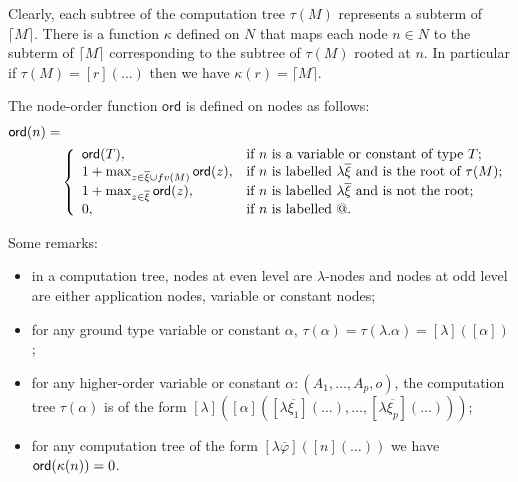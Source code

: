 \documentclass{llncs}
\newcommand\aux[1]{\lceil #1\rceil}
\newcommand\ord[1]{{\sf ord}(#1)}
\newcommand\union{\cup}
\begin{document}
Clearly, each subtree of the computation tree $\tau(M)$ represents a subterm of $\aux{M}$.
There is a function $\kappa$ defined on $N$ that maps each node $n \in N$ to the subterm of $\aux{M}$ corresponding to the subtree of $\tau(M)$ rooted at $n$.
In particular if $\tau(M) = [r](\ldots)$ then we have $\kappa(r) = \aux{M}$.

\begin{definition}
\label{def:nodeorder}
The node-order function $\textsf{ord}$ is defined on nodes as follows:
\begin{eqnarray*}
\ord{n} =& \\
&\left\{
  \begin{array}{ll}
    \ord{T}, & \hbox{if $n$ is a variable or constant of type $T$;} \\
    1 + \max_{z\in \overline{\xi}\union fv(M)} \ord{z}, & \hbox{if $n$ is labelled $\lambda \overline{\xi}$ and is the root of $\tau(M)$;} \\
    1 + \max_{z\in \overline{\xi}} \ord{z}, & \hbox{if $n$ is labelled $\lambda \overline{\xi}$ and is not the root;} \\
    0, & \hbox{if $n$ is labelled @.}
  \end{array}
\right.
\end{eqnarray*}
\end{definition}

\noindent Some remarks:
\begin{itemize}
\item in a computation tree, nodes at even level are $\lambda$-nodes and nodes at odd level are either application nodes,
variable or constant nodes;

\item for any ground type variable or constant $\alpha$, $\tau(\alpha) = \tau(\lambda . \alpha) =  [\lambda]([\alpha])$;

\item for any higher-order variable or constant $\alpha : (A_1,\ldots,A_p,o)$, the computation tree $\tau(\alpha)$ is of the form
$ [\lambda](
        [\alpha]([\lambda \overline{\xi_1}](\ldots), \ldots, [\lambda \overline{\xi_p}](\ldots))
        )
$;

\item for any computation tree of the form $[\lambda \overline{\varphi}]([n]( \ldots ))$ we have $\ord{\kappa(n)}=0$.
\end{itemize}
\end{document}
